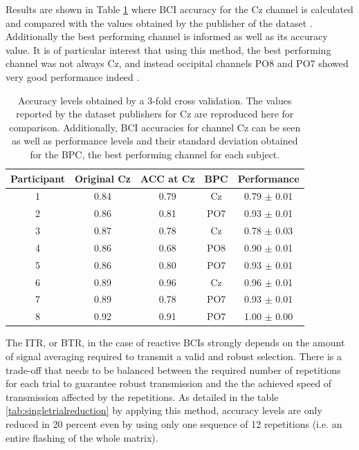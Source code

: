 \documentclass[entropy,article,submit,moreauthors,pdftex,10pt,a4paper]{mdpi}
\begin{document}
Results are shown in Table \ref{tab:results} where BCI accuracy
for the Cz channel is calculated and compared with the values obtained by the publisher of the dataset  \citep{Riccio2013}.  Additionally the best performing channel is informed as well as its accuracy value.  It is of particular interest that using this method, the best performing channel was not always Cz, and instead occipital channels PO8 and PO7 showed very good performance indeed \citep{Huggins2016,Jure2016}.


\begin{table}[H]
\caption{Accuracy levels obtained by a 3-fold cross validation. The values reported by the dataset publishers for Cz are reproduced here for comparison. Additionally, BCI accuracies for channel Cz can be seen as well as performance levels and their standard deviation obtained for the BPC, the best performing channel for each subject.}
\centering
\begin{tabular}{ccccc}
\toprule
\textbf{Participant}	& \textbf{Original Cz}	& \textbf{ACC at Cz}	& \textbf{BPC}	& \textbf{Performance}\\
\midrule
1     &   0.84 &   0.79 & Cz  &   0.79 $\pm$ 0.01 \\
2     &   0.86 &   0.81 & PO7 &   0.93 $\pm$ 0.01 \\
3     &   0.87 &   0.78 & Cz  &   0.78 $\pm$ 0.03 \\
4     &   0.86 &   0.68 & PO8 &   0.90 $\pm$ 0.01 \\
5     &   0.86 &   0.80 & PO7 &   0.93 $\pm$ 0.01 \\
6     &   0.89 &   0.96 & Cz  &   0.96 $\pm$ 0.01 \\
7     &   0.89 &   0.78 & PO7 &   0.93 $\pm$ 0.01 \\
8     &   0.92 &   0.91 & PO7 &   1.00 $\pm$ 0.00 \\
\bottomrule
\end{tabular}
\label{tab:results}
\end{table}

The ITR, or BTR, in the case of reactive BCIs \citep{WolpawJonathanR2012} strongly depends on the amount of signal averaging required to transmit a valid and robust selection.  There is a trade-off that needs to be balanced between the required number of repetitions for each trial to guarantee robust transmission and the the achieved speed of transmission affected by the repetitions.  As detailed in the table \ref{tab:singletrialreduction} by applying this method, accuracy levels are only reduced in 20 percent even by using only one sequence of 12 repetitions (i.e. an entire flashing of the whole matrix).
\end{document}
